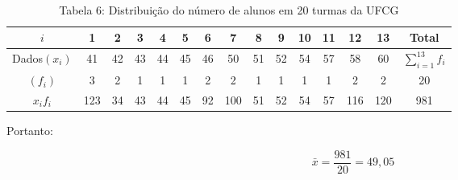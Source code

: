 \documentclass{book}
\begin{document}
\begin{table}[h]
    \centering
    \caption{Tabela 6: Distribuição do número de alunos em 20 turmas da UFCG}\\
    
    \begin{tabular}{c|c|c|c|c|c|c|c|c|c|c|c|c|c|c}
    \hline
    $i$         & 1   & 2   & 3  & 4   & 5  & 6   & 7   & 8   & 9  & 10  & 11   &   12   & 13  & Total \\ 
    \hline
    Dados$(x_i)$ & 41& 42  & 43 & 44  & 45  &46  & 50  & 51  & 52  &54  &57   &  58   &60  & $\sum_{i=1}^{13}{f_i}$ \\
    \hline
    $(f_i)$ & 3 & 2 & 1 & 1 & 1 & 2 & 2 & 1 & 1 & 1 & 1 & 2 & 2 & 20 \\ 
    \hline
    $x_i f_i$ & 123 & 34 & 43 & 44 & 45 & 92 & 100 & 51 & 52 & 54 & 57 & 116 & 120 & 981 \\ 
    \hline
        
    \end{tabular}
   
\end{table}

Portanto:

$$\bar{x}=\frac{981}{20} = 49,05$$
\end{document}
